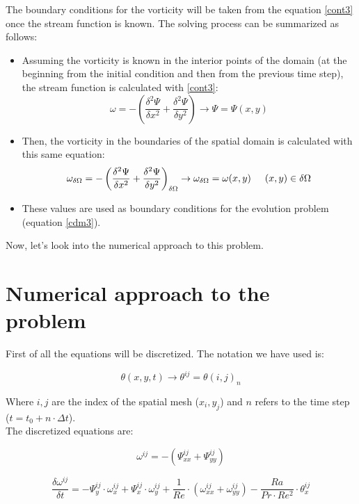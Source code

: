 The boundary conditions for the vorticity will be taken from the equation
\ref{cont3} once the stream function is known. The solving process can be
summarized as follows: 

\begin{itemize}
  \item Assuming the vorticity is known in the interior points of the domain (at
  the beginning from the initial condition and then from the previous time step), the stream function is
  calculated with \ref{cont3}: 
$$ \omega= - \left( \frac{\delta^2 \Psi}{\delta x^2} + \frac{\delta^2
 \Psi}{\delta y^2} \right) \rightarrow \Psi=\Psi(x,y)$$
 \item Then, the vorticity in the boundaries of the spatial domain is calculated
 with this same equation: 
 $$ \omega_{\delta \Omega}= - \left( \frac{\delta^2 \Psi}{\delta
 x^2} + \frac{\delta^2 \Psi}{\delta y^2} \right)_{\delta \Omega} \rightarrow
 \omega_{\delta \Omega}=\omega(x,y) \hspace{0.5cm} (x,y) \in \delta \Omega$$
 \item These values are used as boundary conditions for the evolution problem
 (equation \ref{cdm3}).
\end{itemize} 


Now, let's look into the numerical approach to this problem. \\

\newpage

\section{Numerical approach to the problem}

First of all the equations will be discretized. The notation we have used is: 

$$\theta(x,y,t) \rightarrow \theta^{ij} = \theta(i,j)_n$$

Where $i,j$ are the index of the spatial mesh ($x_i, y_j$) and $n$ refers to the
time step ($t=t_0+n\cdot \Delta t$). \\

The discretized equations are: 

\begin {equation} \label{cont4}
\omega^{ij}= - (\Psi^{ij} _{xx} + \Psi^{ij} _{yy})
\end{equation}

\begin {equation} \label{cdm4}
 \frac{\delta \omega^{ij}}{\delta t} = -\Psi^{ij} _{y} \cdot 
 \omega^{ij}_x + \Psi^{ij} _{x} \cdot \omega^{ij}_y +
 \frac{1}{Re} \cdot ( \omega^{ij}_{xx} + \omega^{ij}_{yy}) - \frac{Ra}{Pr \cdot
 Re^2} \cdot \theta^{ij}_x
\end{equation}

